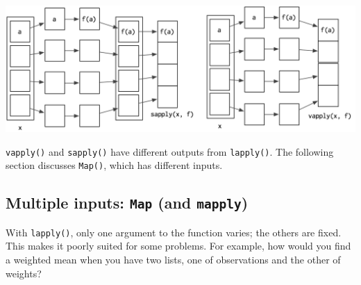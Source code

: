 \begin{Shaded}
\begin{Highlighting}[]
\StringTok{ }
\StringTok{ }
\NormalTok{\}}

\StringTok{ }
\StringTok{ }\NormalTok{(} 
   
\StringTok{ }
    \NormalTok{(}
      \OperatorTok{==}\StringTok{ }
      \OperatorTok{==}\StringTok{ }
\NormalTok{    )}
\StringTok{ }
\NormalTok{  \}}
\NormalTok{\}}
\end{Highlighting}
\end{Shaded}

\includegraphics[width=5.67in]{diagrams/sapply-vapply.png}

\texttt{vapply()} and \texttt{sapply()} have different outputs from
\texttt{lapply()}. The following section discusses \texttt{Map()}, which
has different inputs.

\hypertarget{map}{%
\subsection{\texorpdfstring{Multiple inputs: \texttt{Map} (and
\texttt{mapply})}{Multiple inputs: Map (and mapply)}}\label{map}}

With \texttt{lapply()}, only one argument to the function varies; the
others are fixed. This makes it poorly suited for some problems. For
example, how would you find a weighted mean when you have two lists, one
of observations and the other of weights? 

